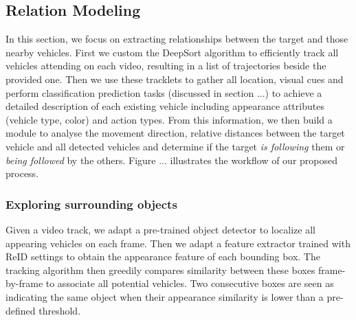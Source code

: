 \subsection{Relation Modeling}
\label{sec:relation_modeling}
In this section, we focus on extracting relationships between the target and those nearby vehicles. 
First we custom the DeepSort algorithm to efficiently track all vehicles attending on each video, resulting in a list of trajectories beside the provided one. Then we use these tracklets to gather all location, visual cues and perform classification prediction tasks (discussed in section ...) to achieve a detailed description of each existing vehicle including appearance attributes (vehicle type, color) and action types.
From this information, we then build a module to analyse the movement direction, relative distances between the target vehicle and all detected vehicles and determine if the target \textit{is following} them or \textit{being followed} by the others. 
Figure ... illustrates the workflow of our proposed process.

\subsubsection{Exploring surrounding objects}
Given a video track, we adapt a pre-trained object detector to localize all appearing vehicles on each frame. Then we adapt a feature extractor trained with ReID settings to obtain the appearance feature of each bounding box. The tracking algorithm then greedily compares similarity between these boxes frame-by-frame to associate all potential vehicles. Two consecutive boxes are seen as indicating the same object when their appearance similarity is lower than a pre-defined threshold. 

